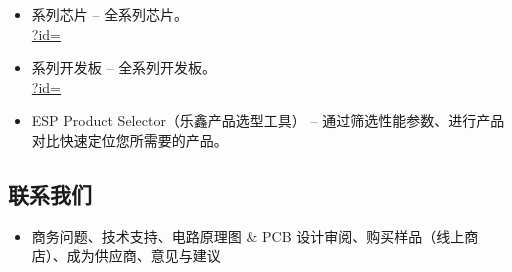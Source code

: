 {\begin{minipage}{\textwidth}
\begin{itemize}
    \item \chipseries{} 系列芯片 --
        {\small \chipseries{} 全系列芯片。}\\
        \href{\linkprefix\linkespsocsCN?id=\chipseries}{\linkprefix\linkespsocsCN?id=\chipseries}
    \item \chipseries{} 系列开发板 --
        {\small \chipseries{} 全系列开发板。}\\
        \href{\linkprefix\linkespdevkitsCN?id=\chipseries}{\linkprefix\linkespdevkitsCN?id=\chipseries}
    \item ESP Product Selector（乐鑫产品选型工具） --
        {\small 通过筛选性能参数、进行产品对比快速定位您所需要的产品。}\\
        \href{\linkprefix\linkespproductselectorCN}{\linkprefix\linkespproductselectorCN}
\end{itemize}

\end{minipage}



\begin{minipage}{\textwidth}

\subsection*{联系我们}

\begin{itemize}
    \item 商务问题、技术支持、电路原理图 \& PCB 设计审阅、购买样品（线上商店）、成为供应商、意见与建议\\
        \href{\linkprefix\linksalesCN}{\linkprefix\linksalesCN}
\end{itemize}

\end{minipage}

}%
